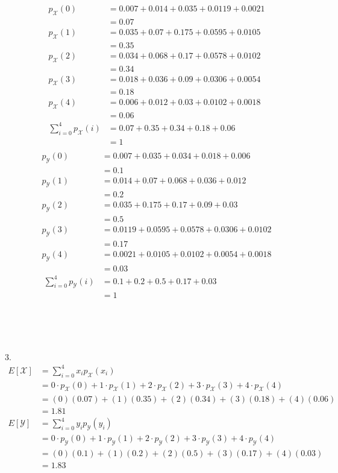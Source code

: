 \documentclass[12pt,border=4pt,multi]{article} %
\begin{document}
\begin{align*}
p_{\mathcal{X}}(0) &= 0.007 + 0.014 + 0.035 + 0.0119 + 0.0021\\
&= 0.07\\
p_{\mathcal{X}}(1) &= 0.035 + 0.07 + 0.175 + 0.0595 + 0.0105\\
&= 0.35\\
p_{\mathcal{X}}(2) &= 0.034 + 0.068 + 0.17 + 0.0578 + 0.0102\\
&= 0.34\\
p_{\mathcal{X}}(3) &= 0.018 + 0.036 + 0.09 + 0.0306 + 0.0054\\
&= 0.18\\
p_{\mathcal{X}}(4) &= 0.006 + 0.012 + 0.03 + 0.0102 + 0.0018\\
&= 0.06\\
\sum_{i = 0}^4 p_{\mathcal{X}}(i) &= 0.07 + 0.35 + 0.34 + 0.18 + 0.06\\
&= 1\\
\end{align*}
\begin{align*}
p_{\mathcal{Y}}(0) &= 0.007 + 0.035 + 0.034 + 0.018 + 0.006\\
&= 0.1\\
p_{\mathcal{Y}}(1) &= 0.014 + 0.07 + 0.068 + 0.036 + 0.012\\ 
&= 0.2\\
p_{\mathcal{Y}}(2) &= 0.035 + 0.175 + 0.17 + 0.09 + 0.03\\
&= 0.5\\
p_{\mathcal{Y}}(3) &= 0.0119 + 0.0595 + 0.0578 + 0.0306 + 0.0102\\ 
&= 0.17\\
p_{\mathcal{Y}}(4) &= 0.0021 + 0.0105 + 0.0102 + 0.0054 + 0.0018\\
&= 0.03\\\
\sum_{i = 0}^4 p_{\mathcal{Y}}(i) &= 0.1 + 0.2 + 0.5 + 0.17 + 0.03\\
&= 1\\
\end{align*}
\\
\\
\\
\\
3.
\begin{align*}
E[\mathcal{X}] &= \sum_{i = 0}^4 x_i p_{\mathcal{X}}(x_i)\\
&= 0 \cdot p_{\mathcal{X}}(0) + 1 \cdot p_{\mathcal{X}}(1) + 2 \cdot p_{\mathcal{X}}(2) + 3 \cdot p_{\mathcal{X}}(3) + 4 \cdot p_{\mathcal{X}}(4)\\
&= (0)(0.07) + (1)(0.35) + (2)(0.34) + (3)(0.18) + (4)(0.06)\\
&= \boxed{1.81}\\
E[\mathcal{Y}] &= \sum_{i = 0}^4 y_i p_{\mathcal{Y}}(y_i)\\
&= 0 \cdot p_{\mathcal{Y}}(0) + 1 \cdot p_{\mathcal{Y}}(1) + 2 \cdot p_{\mathcal{Y}}(2) + 3 \cdot p_{\mathcal{Y}}(3) + 4 \cdot p_{\mathcal{Y}}(4)\\
&= (0)(0.1) + (1)(0.2) + (2)(0.5) + (3)(0.17) + (4)(0.03)\\
&= \boxed{1.83}\\
\end{align*}
\end{document}
